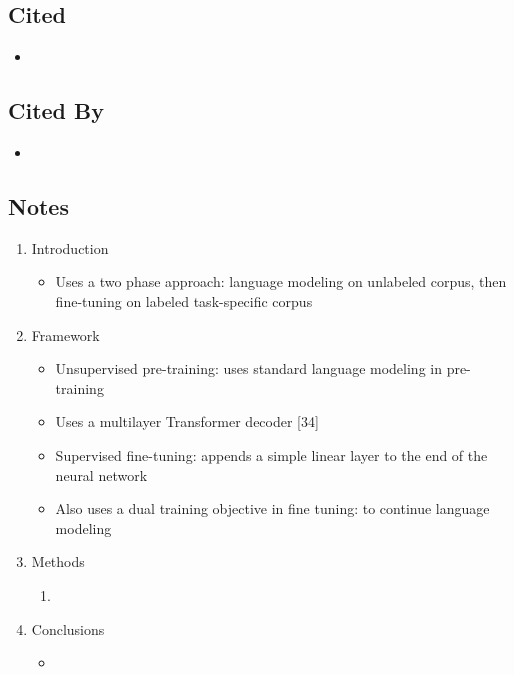 \documentclass{article}
\begin{document}
\subsection*{Cited}
\begin{itemize}
	\item
\end{itemize}

\subsection*{Cited By}
\begin{itemize}
	\item
\end{itemize}

\subsection*{Notes}

\begin{enumerate}
	\item Introduction
	\begin{itemize}
		\item Uses a two phase approach: language modeling on unlabeled corpus, then fine-tuning on labeled task-specific corpus
	\end{itemize}
	\item Framework
	\begin{itemize}
		\item Unsupervised pre-training: uses standard language modeling in pre-training
		\item Uses a multilayer Transformer decoder [34] 
		\item Supervised fine-tuning: appends a simple linear layer to the end of the neural network
		\item Also uses a dual training objective in fine tuning: to continue language modeling
	\end{itemize}
	\item Methods
	\begin{enumerate}
		\item 
	\end{enumerate}
	\item Conclusions
	\begin{itemize}
		\item 
	\end{itemize}
\end{enumerate}

\pagebreak
\end{document}
